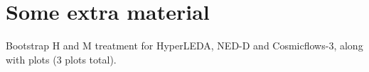 \documentclass[a4paper,fleqn,usenatbib]{mnras}
\begin{document}









\appendix

\section{Some extra material}

Bootstrap H and M treatment for HyperLEDA, NED-D and Cosmicflows-3, along with plots (3 plots total). 




\bsp	%
\label{lastpage}
\end{document}
